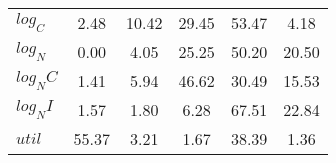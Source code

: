 \begin{center}
\begin{longtable}{lccccc}
$log_C         $	 & 	        2.48	 & 	       10.42	 & 	       29.45	 & 	       53.47	 & 	        4.18 \\ 
$log_N         $	 & 	        0.00	 & 	        4.05	 & 	       25.25	 & 	       50.20	 & 	       20.50 \\ 
$log_NC        $	 & 	        1.41	 & 	        5.94	 & 	       46.62	 & 	       30.49	 & 	       15.53 \\ 
$log_NI        $	 & 	        1.57	 & 	        1.80	 & 	        6.28	 & 	       67.51	 & 	       22.84 \\ 
$util          $	 & 	       55.37	 & 	        3.21	 & 	        1.67	 & 	       38.39	 & 	        1.36 \\ 
\end{longtable}
 \end{center}

